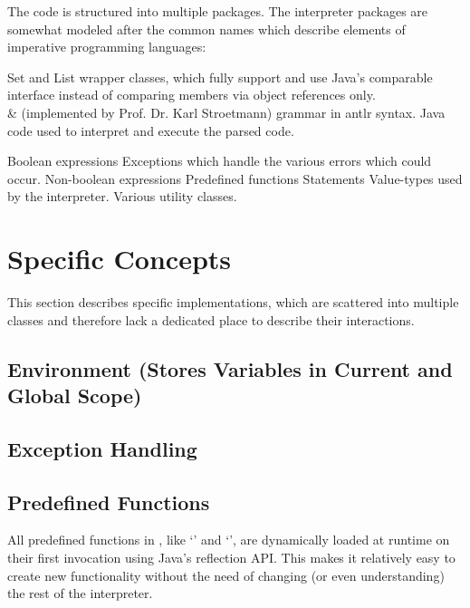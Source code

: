 The code is structured into multiple packages. The interpreter packages are somewhat modeled after the common names which describe elements of imperative programming languages:

\begin{itemize}
			{Set and List wrapper classes, which fully support and use Java's comparable interface instead of comparing members via object references only.\\&
			 (implemented by Prof. Dr. Karl Stroetmann)}
			{\SetlX{} grammar in antlr syntax.}
			{Java code used to interpret and execute the parsed \SetlX{} code.}
		\begin{itemize}
				{Boolean expressions}
				{Exceptions which handle the various errors which could occur.}
				{Non-boolean expressions}
				{Predefined functions}
				{Statements}
				{Value-types used by the interpreter.}
				{Various utility classes.}
		\end{itemize}
\end{itemize}

\section{Specific Concepts}\label{specificConcepts}

This section describes specific implementations, which are scattered into multiple classes and therefore lack a dedicated place to describe their interactions.

\subsection{Environment (Stores Variables in Current and Global Scope)}


\subsection{Exception Handling}


\subsection{Predefined Functions}

All predefined functions in \setlX{}, like `' and `', are dynamically loaded at runtime on their first invocation using Java's reflection API. This makes it relatively easy to create new functionality without the need of changing (or even understanding) the rest of the interpreter.

